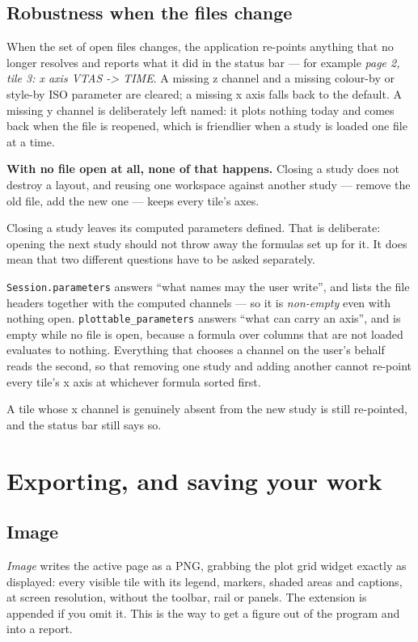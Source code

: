 \documentclass[11pt,a4paper,oneside]{report}
\newcommand{\code}[1]{\texttt{#1}}
\begin{document}
\section{Robustness when the files change}
\label{sec:swap}

When the set of open files changes, the application re-points anything that no
longer resolves and reports what it did in the status bar --- for example
\emph{page 2, tile 3: x axis VTAS -> TIME}. A missing z channel and a missing
colour-by or style-by ISO parameter are cleared; a missing x axis falls back to
the default. A missing y channel is deliberately left named: it plots nothing
today and comes back when the file is reopened, which is friendlier when a study
is loaded one file at a time.

\textbf{With no file open at all, none of that happens.} Closing a study does
not destroy a layout, and reusing one workspace against another study --- remove
the old file, add the new one --- keeps every tile's axes.

Closing a study leaves its computed parameters defined. That is deliberate:
opening the next study should not throw away the formulas set up for it. It does
mean that two different questions have to be asked separately.

\code{Session.parameters} answers ``what names may the user write'', and lists
the file headers together with the computed channels --- so it is
\emph{non-empty} even with nothing open. \code{plottable\_parameters} answers
``what can carry an axis'', and is empty while no file is open, because a
formula over columns that are not loaded evaluates to nothing. Everything that
chooses a channel on the user's behalf reads the second, so that removing one
study and adding another cannot re-point every tile's x axis at whichever
formula sorted first.

A tile whose x channel is genuinely absent from the new study is still
re-pointed, and the status bar still says so.

\chapter{Exporting, and saving your work}

\section{Image}

\emph{Image} writes the active page as a PNG, grabbing the plot grid widget
exactly as displayed: every visible tile with its legend, markers, shaded areas
and captions, at screen resolution, without the toolbar, rail or panels. The
extension is appended if you omit it. This is the way to get a figure out of the
program and into a report.
\end{document}
